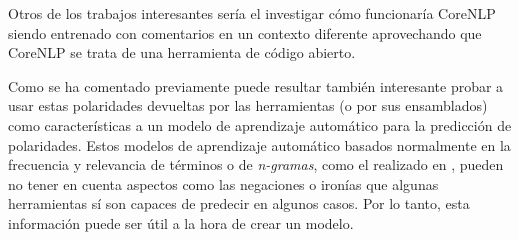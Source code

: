 Otros de los trabajos interesantes sería el investigar cómo funcionaría CoreNLP siendo entrenado con comentarios en un contexto diferente aprovechando que CoreNLP se trata de una herramienta de código abierto.

Como se ha comentado previamente puede resultar también interesante probar a usar estas polaridades devueltas por las herramientas (o por sus ensamblados) como características a un modelo de aprendizaje automático para la predicción de polaridades. Estos modelos de aprendizaje automático basados normalmente en la frecuencia y relevancia de términos o de \textit{n-gramas}, como el realizado en \cite{ana}, pueden no tener en cuenta aspectos como las negaciones o ironías que algunas herramientas sí son capaces de predecir en algunos casos. Por lo tanto, esta información puede ser útil a la hora de crear un modelo.